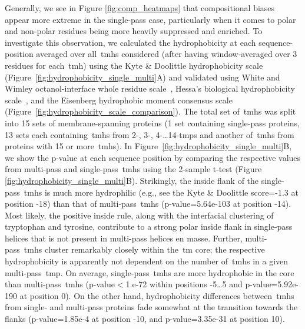 Generally, we see in Figure \ref{fig:comp_heatmaps} that compositional biases appear more extreme in the single\--pass case, particularly when it comes to polar and non-polar residues being more heavily suppressed and enriched.
To investigate this observation, we calculated the hydrophobicity at each sequence-position averaged over all~\gls{tmh}s considered (after having window-averaged over 3 residues for each~\gls{tmh}) using the Kyte \& Doolittle hydrophobicity scale~\cite{Kyte1982} (Figure~\ref{fig:hydrophobicity_single_multi}A) and validated using White and Wimley octanol-interface whole residue scale~\cite{White1999}, Hessa’s biological hydrophobicity scale~\cite{Hessa2005}, and the Eisenberg hydrophobic moment consensus scale~\cite{Eisenberg1984} (Figure~\ref{fig:hydrophobicity_scale_comparison}).
The total set of~\gls{tmh}s was split into 15 sets of membrane-spanning proteins (1 set containing single\--pass proteins, 13 sets each containing~\gls{tmh}s from 2-, 3-, 4-\ldots 14-\gls{tmp}s and another of~\gls{tmh}s from proteins with 15 or more~\gls{tmh}s).
In Figure~\ref{fig:hydrophobicity_single_multi}B, we show the p\--value at each sequence position by comparing the respective values from multi\--pass and single\--pass~\gls{tmh}s using the 2-sample t-test (Figure \ref{fig:hydrophobicity_single_multi}B).
Strikingly, the inside flank of the single\--pass~\gls{tmh}s is much more hydrophilic (e.g., see the Kyte \& Doolittle score=-1.3 at position -18) than that of multi\--pass~\gls{tmh}s (p\--value=5.64e-103 at position -14).
Most likely, the positive inside rule, along with the interfacial clustering of tryptophan and tyrosine, contribute to a strong polar inside flank in single\--pass helices that is not present in multi\--pass helices en masse.
Further, multi\--pass~\gls{tmh}s cluster remarkably closely within the~\gls{tm} core; the respective hydrophobicity is apparently not dependent on the number of~\gls{tmh}s in a given multi\--pass~\gls{tmp}.
On average, single\--pass~\gls{tmh}s are more hydrophobic in the core than multi\--pass~\gls{tmh}s (p\--value$<$1.e-72 within positions -5…5 and p\--value=5.92e-190 at position 0).
On the other hand, hydrophobicity differences between~\gls{tmh}s from single- and multi\--pass proteins fade somewhat at the transition towards the flanks (p\--value=1.85e-4 at position -10, and p\--value=3.35e-31 at position 10).


